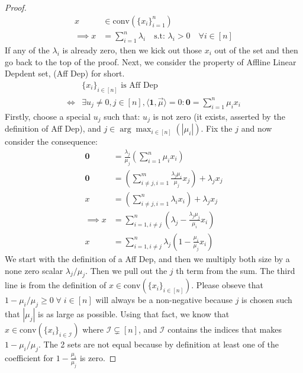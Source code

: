 \documentclass[]{article}
\theoremstyle{definition}
\begin{document}
    \begin{proof}
        \begin{align}
            x &\in \text{conv}(\{x_i\}_{i = 1}^n) 
            \\
            \implies 
            x &= \sum_{i = 1}^{n}\lambda_i \quad \text{s.t: }\lambda_i > 0 \quad \forall i \in [n]
        \end{align}
        If any of the $\lambda_i$ is already zero, then we kick out those $x_i$ out of the set and then go back to the top of the proof. Next, we consider the property of Affline Linear Depdent set, (Aff Dep) for short. 
        \begin{align}
            & \{x_i\}_{i \in [n]} \text{ is Aff Dep}
            \\
            \iff& 
            \exists u_j \neq 0, j \in [n], \langle \mathbf 1, \vec{\mu}\rangle = 0: 
            \mathbf 0 = 
            \sum_{i = 1}^{n}\mu_i x_i
        \end{align}
        Firstly, choose a special $u_j$ such that: $u_j$ is not zero (it exists, asserted by the definition of Aff Dep), and $j \in \arg\max_{i \in [n]}(|\mu_i|)$. Fix the $j$ and now consider the consequence: 
        \begin{align}
            \mathbf 0 &= \frac{\lambda_j}{\mu_j}\left(
                \sum_{i = 1}^{n}\mu_ix_i
            \right)
            \\
            \mathbf 0 &= 
            \left(
                \sum_{i \neq j, i = 1}^{m}\frac{\lambda_j\mu_i}{\mu_j} x_j
            \right) + \lambda_j x_j
            \\
            x &= \left(
                \sum_{i\neq j, i = 1}^{n} \lambda_i x_i
            \right) + \lambda_j x_j
            \\
            \implies 
            x &= 
                \sum_{i = 1, i \neq j}^{n}
                \left(
                    \lambda_j - \frac{\lambda_j\mu_j}{\mu_i}x_i
                \right)
            \\
            x &= 
            \sum_{i = 1, i \neq j}^{n}
            \lambda_j\left(
                1 - \frac{\mu_i}{\mu_j}x_i
            \right)
        \end{align}
        We start with the definition of a Aff Dep, and then we multiply both size by a none zero scalar $\lambda_j /\mu_j$. Then we pull out the $j$ th term from the sum. The third line is from the definition of $x\in \text{conv}(\{x_i\}_{i \in [n]})$. Please obseve that $1 - \mu_i/\mu_j \ge 0 \;\forall\; i \in [n]$ will always be a non-negative because $j$ is chosen such that $|\mu_j|$ is as large as possible. Using that fact, we know that $x\in \text{conv}(\{x_i\}_{i\in \mathcal I})$ where $\mathcal I \subsetneq [n]$, and $\mathcal I$ contains the indices that makes $1 - \mu_i/\mu_j$. The 2 sets are not equal because by definition at least one of the coefficient for $1 - \frac{\mu_i}{\mu_j}$ is zero. 
    \end{proof}
\end{document}
